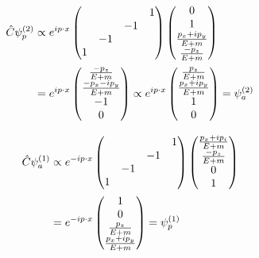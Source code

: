 \begin{align}
    \Hat{C}\psi^{(2)}_p&\propto e^{ip\cdot x}\begin{pmatrix}
        &&&1\\
        &&-1&\\
        &-1&&\\
        1&&&
    \end{pmatrix}\begin{pmatrix}
        0\\
        1\\
        \frac{p_x+ip_y}{E+m}\\
        \frac{-p_z}{E+m}
    \end{pmatrix}\nonumber\\
    &=e^{ip\cdot x}\begin{pmatrix}
        \frac{-p_z}{E+m}\\
        \frac{-p_x-ip_y}{E+m}\\
        -1\\
        0
    \end{pmatrix}\propto e^{ip\cdot x}\begin{pmatrix}
        \frac{p_z}{E+m}\\
        \frac{p_x+ip_y}{E+m}\\
        1\\
        0
    \end{pmatrix}=\psi^{(2)}_a
\end{align}

\begin{align}
    \Hat{C}\psi^{(1)}_a&\propto e^{-ip\cdot x}\begin{pmatrix}
        &&&1\\
        &&-1&\\
        &-1&&\\
        1&&&
    \end{pmatrix}\begin{pmatrix}
        \frac{p_x+ip_i}{E+m}\\
        \frac{-p_z}{E+m}\\
        0\\
        1
    \end{pmatrix}\nonumber\\
    &=e^{-ip\cdot x}\begin{pmatrix}
        1\\
        0\\
        \frac{p_z}{E+m}\\
        \frac{p_x+ip_y}{E+m}
    \end{pmatrix}=\psi^{(1)}_p
\end{align}


